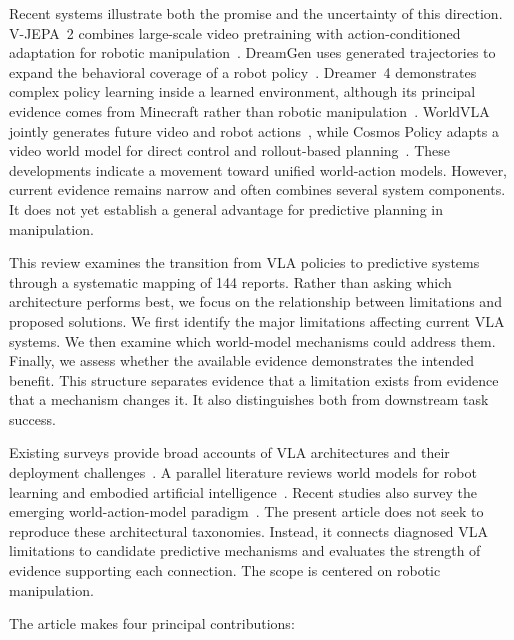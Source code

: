 \documentclass{ieeeaccess}
\begin{document}
Recent systems illustrate both the promise and the uncertainty of this direction. V-JEPA~2 combines large-scale video pretraining with action-conditioned adaptation for robotic manipulation~\cite{vjepa2}. DreamGen uses generated trajectories to expand the behavioral coverage of a robot policy~\cite{dreamgen}. Dreamer~4 demonstrates complex policy learning inside a learned environment, although its principal evidence comes from Minecraft rather than robotic manipulation~\cite{dreamer4}. WorldVLA jointly generates future video and robot actions~\cite{worldvla}, while Cosmos Policy adapts a video world model for direct control and rollout-based planning~\cite{cosmospolicy}. These developments indicate a movement toward unified world-action models. However, current evidence remains narrow and often combines several system components. It does not yet establish a general advantage for predictive planning in manipulation.

This review examines the transition from VLA policies to predictive systems through a systematic mapping of \textcolor[RGB]{104,48,148}{144 reports}. Rather than asking which architecture performs best, we focus on the relationship between limitations and proposed solutions. We first identify the major limitations affecting current VLA systems. We then examine which world-model mechanisms could address them. Finally, we assess whether the available evidence demonstrates the intended benefit. This structure separates evidence that a limitation exists from evidence that a mechanism changes it. It also distinguishes both from downstream task success.

Existing surveys provide broad accounts of VLA architectures and their deployment challenges~\cite{ma2024survey,zhong2025token,kawaharazuka2025,din2025priorvlasurvey}. A parallel literature reviews world models for robot learning and embodied artificial intelligence~\cite{hou2026wm,li2025wm,wang2026manipwmsurvey}. Recent studies also survey the emerging world-action-model paradigm~\cite{wamfrontier,wamsurvey}. The present article does not seek to reproduce these architectural taxonomies. Instead, it connects diagnosed VLA limitations to candidate predictive mechanisms and evaluates the strength of evidence supporting each connection. The scope is centered on robotic manipulation.

The article makes four principal contributions:
\end{document}
